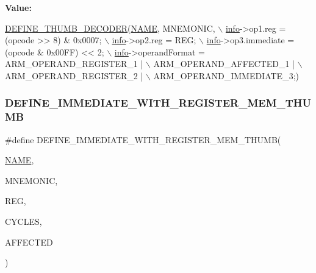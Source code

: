 {\bfseries Value\+:}
\begin{DoxyCode}
\mbox{\hyperlink{decoder-thumb_8c_a44d34ec3fd7c2c2ee51ff5966678c86e}{DEFINE\_THUMB\_DECODER}}(\mbox{\hyperlink{inflate_8h_a164ea0159d5f0b5f12a646f25f99eceaa67bc2ced260a8e43805d2480a785d312}{NAME}}, MNEMONIC, \(\backslash\)
        \mbox{\hyperlink{libretro_8h_structretro__game__info}{info}}->op1.reg = (opcode >> 8) & 0x0007; \(\backslash\)
        \mbox{\hyperlink{libretro_8h_structretro__game__info}{info}}->op2.reg = REG; \(\backslash\)
        \mbox{\hyperlink{libretro_8h_structretro__game__info}{info}}->op3.immediate = (opcode & 0x00FF) << 2; \(\backslash\)
        \mbox{\hyperlink{libretro_8h_structretro__game__info}{info}}->operandFormat = ARM\_OPERAND\_REGISTER\_1 | \(\backslash\)
            ARM\_OPERAND\_AFFECTED\_1 | \(\backslash\)
            ARM\_OPERAND\_REGISTER\_2 | \(\backslash\)
            ARM\_OPERAND\_IMMEDIATE\_3;)
\end{DoxyCode}
\mbox{\label{decoder-thumb_8c_a03f28aff1515febe3ffdad67692ad9ee}} 
\subsubsection{\texorpdfstring{D\+E\+F\+I\+N\+E\+\_\+\+I\+M\+M\+E\+D\+I\+A\+T\+E\+\_\+\+W\+I\+T\+H\+\_\+\+R\+E\+G\+I\+S\+T\+E\+R\+\_\+\+M\+E\+M\+\_\+\+T\+H\+U\+MB}{DEFINE\_IMMEDIATE\_WITH\_REGISTER\_MEM\_THUMB}}
{\footnotesize\ttfamily \#define D\+E\+F\+I\+N\+E\+\_\+\+I\+M\+M\+E\+D\+I\+A\+T\+E\+\_\+\+W\+I\+T\+H\+\_\+\+R\+E\+G\+I\+S\+T\+E\+R\+\_\+\+M\+E\+M\+\_\+\+T\+H\+U\+MB(\begin{DoxyParamCaption}\item[{}]{\mbox{\hyperlink{inflate_8h_a164ea0159d5f0b5f12a646f25f99eceaa67bc2ced260a8e43805d2480a785d312}{N\+A\+ME}},  }\item[{}]{M\+N\+E\+M\+O\+N\+IC,  }\item[{}]{R\+EG,  }\item[{}]{C\+Y\+C\+L\+ES,  }\item[{}]{A\+F\+F\+E\+C\+T\+ED }\end{DoxyParamCaption})}

